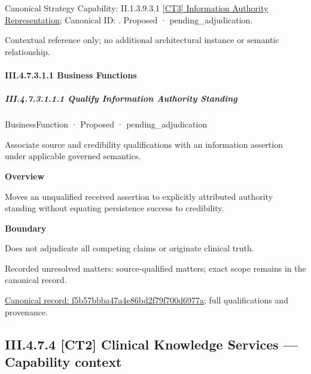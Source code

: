 {\small Canonical Strategy Capability: II.1.3.9.3.1 \hyperref[element:8c850faafb334f97a81a0b4cd8fdb65f]{[CT3] Information Authority Representation}; Canonical ID: \texttt{}. Proposed · pending\_adjudication.}\par
Contextual reference only; no additional architectural instance or semantic relationship.\par
\paragraph*{III.4.7.3.1.1 Business Functions}
\label{navigation:III.4.7.3.1.1}

\subparagraph*{III.4.7.3.1.1.1 Qualify Information Authority Standing}
\label{navigation:III.4.7.3.1.1.1}

\label{element:f5b57bbba47a4e86bd2f79f700d6977a}
{\small BusinessFunction · Proposed · pending\_adjudication}\par

Associate source and credibility qualifications with an information assertion under applicable governed semantics.



\textbf{Overview}



Moves an unqualified received assertion to explicitly attributed authority standing without equating persistence success to credibility.



\textbf{Boundary}



Does not adjudicate all competing claims or originate clinical truth.


{\small Recorded unresolved matters: source-qualified matters; exact scope remains in the canonical record.}\par
{\footnotesize \href{../../../../../../../continuum/business/business-function/f5b57bbba47a4e86bd2f79f700d6977a.md}{Canonical record: f5b57bbba47a4e86bd2f79f700d6977a}; full qualifications and provenance.}\par
\subsection*{III.4.7.4 [CT2] Clinical Knowledge Services — Capability context}
\label{navigation:III.4.7.4}

